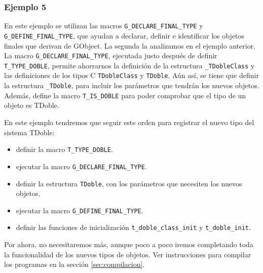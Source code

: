 \subsubsection{Ejemplo 5}
En este ejemplo se utilizan las macros \texttt{G\_DECLARE\_FINAL\_TYPE} y
\texttt{G\_DEFINE\_FINAL\_TYPE}, que ayudan a declarar, definir e identificar los objetos finales que
derivan de \textsf{GObject}. La segunda la analizamos en el ejemplo anterior.
La macro \texttt{G\_DECLARE\_FINAL\_TYPE}, ejecutada justo después de definir \texttt{T\_TYPE\_DOBLE},
permite ahorrarnos la definición de la estructura \texttt{\_TDobleClass} y las definiciones de los
tipos C \texttt{TDobleClass} y \texttt{TDoble}. Aún así, se tiene que definir la estructura \texttt{\_TDoble},
para incluir los parámetros que tendrán los nuevos objetos. Además, define la macro \texttt{T\_IS\_DOBLE}
para poder comprobar que el tipo de un objeto es \textsf{TDoble}.

En este ejemplo tendremos  que seguir este orden para registrar el nuevo tipo del sistema \textsf{TDoble}:
\begin{itemize}
  \tightlist
\item definir la macro \texttt{T\_TYPE\_DOBLE}.
\item ejecutar la macro \texttt{G\_DECLARE\_FINAL\_TYPE}.
\item definir la estructura \texttt{TDoble}, con los parámetros que necesiten los nuevos objetos.
\item ejecutar la macro \texttt{G\_DEFINE\_FINAL\_TYPE}.
\item definir las funciones de inicialización \texttt{t\_doble\_class\_init} y \texttt{t\_doble\_init}.
\end{itemize}
Por ahora, no necesitaremos más, aunque poco a poco iremos completando toda la funcionalidad
de los nuevos tipos de objetos.
Ver instrucciones para compilar los programas en la sección \ref{sec:compilacion}.

